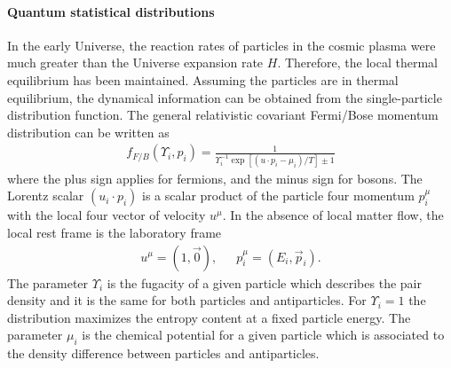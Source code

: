 {\paragraph{Quantum statistical distributions}
In the early Universe, the reaction rates of particles in the cosmic plasma were much greater than the Universe expansion rate $H$. Therefore, the local thermal equilibrium has been maintained. Assuming the particles are in thermal equilibrium, the dynamical information can be obtained from the single-particle distribution function. The general relativistic covariant Fermi/Bose momentum distribution can be written as
\begin{align}
f_{F/B}(\Upsilon_i,p_i)=\frac{1}{\Upsilon^{-1}_i\exp{\left[(u\cdot p_i-\mu_i)/T\right]}\pm1}
\end{align}
where the plus sign applies for fermions, and the minus sign for bosons. The Lorentz scalar $(u_i\cdot p_i)$ is a scalar product of the particle four momentum $p^\mu_i$ with the local four vector of velocity $u^\mu$. In the absence of local matter flow, the local rest frame is the laboratory frame 
\begin{align}
u^\mu=\left(1,\vec{0}\right),\,\,\,\,\,\,\,\,\, p^\mu_i=\left(E_i,\vec{p}_i\right).
\end{align}  
The parameter $\Upsilon_i$ is the fugacity of a given particle which describes the pair density and it is the same for both particles and antiparticles. For $\Upsilon_i=1$ the distribution maximizes the entropy content at a fixed particle energy. The parameter $\mu_i$ is the chemical potential for a given particle which is associated to the density difference between particles and antiparticles. 

}
